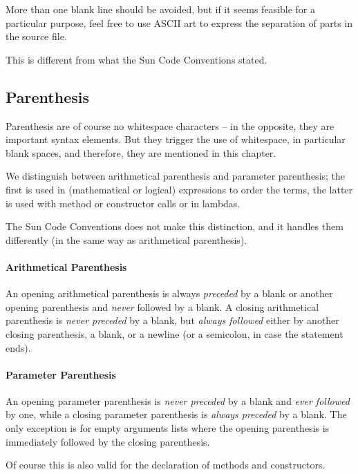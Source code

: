 \documentclass[11pt,a4paper, titlepage, parskip=half, headsepline, footsepline, cleardoublepage=current, headheight=1cm]{scrbook}
\begin{document}
More than one blank line should be avoided, but if it seems feasible for a particular purpose, feel free to use ASCII art to express the separation of parts in the source file.

This is different from what the Sun Code Conventions\autocite{SUN_CODE_CONVENTIONS:BlankLines} stated.

\subsection{Parenthesis}\label{sec:Parenthesis}
Parenthesis are of course no whitespace characters – in the opposite, they are important syntax elements. But they trigger the use of whitespace, in particular blank spaces, and therefore, they are mentioned in this chapter.

We distinguish between arithmetical parenthesis and parameter parenthesis; the first is used in (mathematical or logical) expressions to order the terms, the latter is used with method or constructor calls or in lambdas.

The Sun Code Conventions\autocite{SUN_CODE_CONVENTIONS:BlankSpaces} does not make this distinction, and it handles them differently (in the same way as arithmetical parenthesis).

\paragraph{Arithmetical Parenthesis}
An opening arithmetical parenthesis is always \textit{preceded} by a blank or another opening parenthesis and \textit{never} followed by a blank. A closing arithmetical parenthesis is \textit{never preceded} by a blank, but \textit{always followed} either by another closing parenthesis, a blank, or a newline (or a semicolon, in case the statement ends).

\paragraph{Parameter Parenthesis}\label{sec:ParameterParenthesis}
An opening parameter parenthesis is \textit{never preceded} by a blank and \textit{ever followed} by one, while a closing parameter parenthesis is \textit{always preceded} by a blank. The only exception is for empty arguments lists where the opening parenthesis is immediately followed by the closing parenthesis.

Of course this is also valid for the declaration of methods and constructors.
\end{document}
